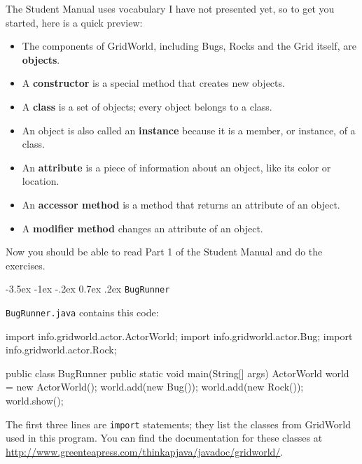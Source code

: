 \documentclass{book}
\makeatletter
\renewcommand{\section}{\@startsection 
    {section} {1} {0mm}%
    {-3.5ex \@plus -1ex \@minus -.2ex}%
    {0.7ex \@plus.2ex}%
    {\normalfont\Large\bfseries}}
\makeatother
\begin{document}
The Student Manual uses vocabulary I have not presented yet, so to
get you started, here is a quick preview:

\begin{itemize}

\item The components of GridWorld, including Bugs, Rocks and the Grid
itself, are {\bf objects}.

\item A {\bf constructor} is a special method that creates new objects.

\item A {\bf class} is a set of objects; every object belongs to a
class.

\item An object is also called an {\bf instance} because it is a member,
or instance, of a class.

\item An {\bf attribute} is a piece of information about an object, like
its color or location.

\item An {\bf accessor method} is a method that returns an attribute of
an object.

\item A {\bf modifier method} changes an attribute of an object.

\end{itemize}

Now you should be able to read Part 1 of the Student Manual and do
the exercises.

\section{{\tt BugRunner}}

{\tt BugRunner.java} contains this code:

\begin{verbatimtab}
import info.gridworld.actor.ActorWorld;
import info.gridworld.actor.Bug;
import info.gridworld.actor.Rock;

public class BugRunner
{
    public static void main(String[] args)
    {
        ActorWorld world = new ActorWorld();
        world.add(new Bug());
        world.add(new Rock());
        world.show();
    }
}
\end{verbatimtab}

The first three lines are {\tt import} statements; they list the
classes from GridWorld used in this program.  You can find the
documentation for these classes at
\url{http://www.greenteapress.com/thinkapjava/javadoc/gridworld/}.
\end{document}
